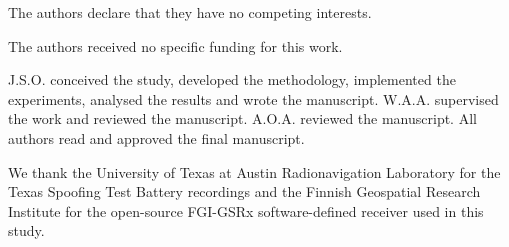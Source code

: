 \documentclass[pdflatex,sn-basic]{sn-jnl}
\theoremstyle{thmstyleone}
\theoremstyle{thmstyletwo}
\theoremstyle{thmstylethree}
\begin{document}
The authors declare that they have no competing interests.

The authors received no specific funding for this work.

J.S.O. conceived the study, developed the methodology, implemented the experiments,
analysed the results and wrote the manuscript. W.A.A. supervised the work and
reviewed the manuscript. A.O.A. reviewed the manuscript. All authors read and
approved the final manuscript.

We thank the University of Texas at Austin Radionavigation Laboratory for the Texas
Spoofing Test Battery recordings and the Finnish Geospatial Research Institute for
the open-source FGI-GSRx software-defined receiver used in this study.


\end{document}
